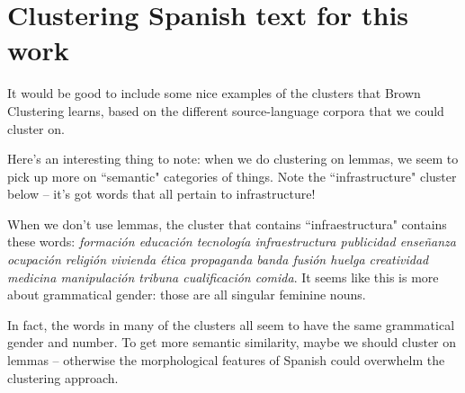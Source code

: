 \section{Clustering Spanish text for this work}

It would be good to include some nice examples of the clusters that Brown
Clustering learns, based on the different source-language corpora that we could
cluster on.

Here's an interesting thing to note: when we do clustering on lemmas, we seem
to pick up more on ``semantic" categories of things. Note the ``infrastructure"
cluster below -- it's got words that all pertain to infrastructure!

When we don't use lemmas, the cluster that contains ``infraestructura" contains
these words: \emph{formación educación tecnología infraestructura publicidad
enseñanza ocupación religión vivienda ética propaganda banda fusión huelga
creatividad medicina manipulación tribuna cualificación comida}. It seems like
this is more about grammatical gender: those are all singular feminine nouns.

In fact, the words in many of the clusters all seem to have the same
grammatical gender and number. To get more semantic similarity, maybe we should
cluster on lemmas -- otherwise the morphological features of Spanish could
overwhelm the clustering approach.


